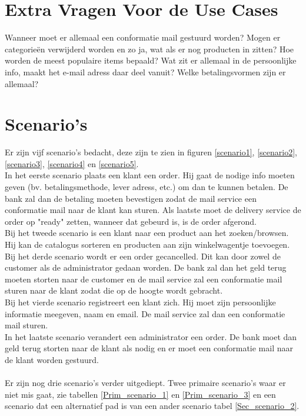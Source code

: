 \documentclass[•]{article}
\begin{document}
\section{Extra Vragen Voor de Use Cases}
Wanneer moet er allemaal een conformatie mail gestuurd worden? Mogen er categorie\"en verwijderd worden en zo ja, wat als er nog producten in zitten? Hoe worden de meest populaire items bepaald? Wat zit er allemaal in de persoonlijke info, maakt het e-mail adress daar deel vanuit? Welke betalingsvormen zijn er allemaal?

\section{Scenario's}
Er zijn vijf scenario's bedacht, deze zijn te zien in figuren \ref{scenario1}, \ref{scenario2}, \ref{scenario3}, \ref{scenario4} en \ref{scenario5}.\\
In het eerste scenario plaats een klant een order. Hij gaat de nodige info moeten geven (bv. betalingsmethode, lever adress, etc.) om dan te kunnen betalen. De bank zal dan de betaling moeten bevestigen zodat de mail service een conformatie mail naar de klant kan sturen. Als laatste moet de delivery service de order op "ready" zetten, wanneer dat gebeurd is, is de order afgerond.\\
Bij het tweede scenario is een klant naar een product aan het zoeken/browsen. Hij kan de catalogus sorteren en producten aan zijn winkelwagentje toevoegen.\\
Bij het derde scenario wordt er een order gecancelled. Dit kan door zowel de customer als de administrator gedaan worden. De bank zal dan het geld terug moeten storten naar de customer en de mail service zal een conformatie mail sturen naar de klant zodat die op de hoogte wordt gebracht.\\
Bij het vierde scenario registreert een klant zich. Hij moet zijn persoonlijke informatie meegeven, naam en email. De mail service zal dan een conformatie mail sturen.\\
In het laatste scenario verandert een administrator een order. De bank moet dan geld terug storten naar de klant als nodig en er moet een conformatie mail naar de klant worden gestuurd.
\\
\\
Er zijn nog drie scenario's verder uitgediept. Twee primaire scenario's waar er niet mis gaat, zie tabellen \ref{Prim_scenario_1} en \ref{Prim_scenario_3} en een scenario dat een alternatief pad is van een ander scenario tabel \ref{Sec_scenario_2}.\\
\end{document}
